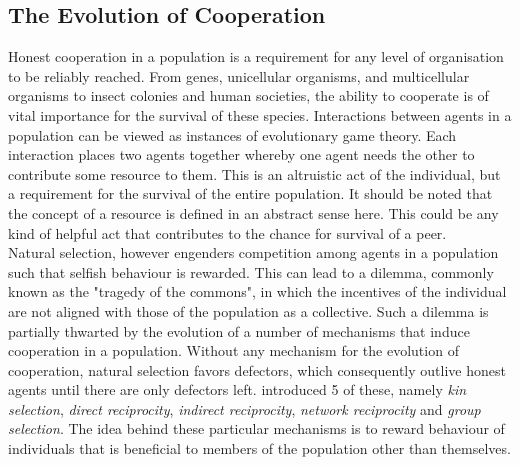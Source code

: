 \documentclass[11pt,a4paper]{report}
\theoremstyle{definition}
\theoremstyle{theorem}
\theoremstyle{proposition}
\theoremstyle{corollary}
\theoremstyle{lemma}
\theoremstyle{example}
\theoremstyle{remark}
\begin{document}
\subsection{The Evolution of Cooperation}
\label{subsec:The Evolution of Cooperation}
Honest cooperation in a population is a requirement for any level of organisation to be reliably reached. From genes, unicellular organisms, and multicellular organisms to insect colonies and human societies, the ability to cooperate is of vital importance for the survival of these species. Interactions between agents in a population can be viewed as instances of evolutionary game theory. Each interaction places two agents together whereby one agent needs the other to contribute some resource to them. This is an altruistic act of the individual, but a requirement for the survival of the entire population. It should be noted that the concept of a resource is defined in an abstract sense here. This could be any kind of helpful act that contributes to the chance for survival of a peer.\vspace{1em}\\

\noindent{}Natural selection, however engenders competition among agents in a population such that selfish behaviour is rewarded. This can lead to a dilemma, commonly known as the "tragedy of the commons", in which the incentives of the individual are not aligned with those of the population as a collective. Such a dilemma is partially thwarted by the evolution of a number of mechanisms that induce cooperation in a population. Without any mechanism for the evolution of cooperation, natural selection favors defectors, which consequently outlive honest agents until there are only defectors left. \cite{5 Rules for the Evolution of Cooperation} introduced 5 of these, namely {\it kin selection}, {\it direct reciprocity}, {\it indirect reciprocity}, {\it network reciprocity} and {\it group selection}. The idea behind these particular mechanisms is to reward behaviour of individuals that is beneficial to members of the population other than themselves. \vspace{1em}\\
\end{document}
